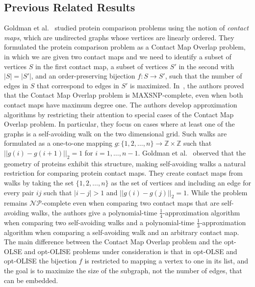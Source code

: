 \documentclass[11pt]{article}
\newcommand{\NP}{\mbox{$\mathcal{NP}$}}
\begin{document}
\subsection{Previous Related Results}\label{subsec:previous}
Goldman et al.~\cite{Goldman1999} studied protein comparison problems using the notion of {\em contact maps}, which are undirected graphs whose vertices are linearly ordered. They formulated the protein comparison problem as a {\sc Contact Map Overlap} problem, in which we are given two contact maps and we need to identify a subset of vertices $S$ in the first contact map, a subset of vertices $S'$ in the second with $|S| = |S'|$, and an order-preserving bijection $f: S \longrightarrow S'$, such that the number of edges in $S$ that correspond to edges in $S'$ is maximized. In~\cite{Goldman1999}, the authors proved that the {\sc Contact Map Overlap} problem is MAXSNP-complete, even when both contact maps have maximum degree one. The authors develop approximation algorithms by restricting their attention to special cases of the {\sc Contact Map Overlap} problem. In particular, they focus on cases where at least one of the graphs is a self-avoiding walk on the two dimensional grid.  Such walks are formulated as a one-to-one mapping $g : \{1, 2,\dotsc, n\} \to \mathbb{Z}\times\mathbb{Z}$ such that $||g(i)-g(i+1)||_2 = 1$ for $i = 1,\dotsc,n-1$.  Goldman et al.~\cite{Goldman1999} observed that the geometry of proteins exhibit this structure, making self-avoiding walks a natural restriction for comparing protein contact maps.  They create contact maps from walks by taking the set $\{1,2,\dotsc,n\}$ as the set of vertices and including an edge for every pair $ij$ such that $|i - j| > 1$ and $||g(i)-g(j)||_2 = 1$. While the problem remains \NP-complete even when comparing two contact maps that are self-avoiding walks, the authors give a polynomial-time $\frac{1}{4}$-approximation algorithm when comparing two self-avoiding walks and a polynomial-time $\frac{1}{3}$-approximation algorithm when comparing a self-avoiding walk and an arbitrary contact map. The main difference between the {\sc Contact Map Overlap} problem and the opt-OLSE and opt-OLISE problems under consideration is that in opt-OLSE and opt-OLISE the bijection $f$ is restricted to mapping a vertex to one in its list, and the goal is to maximize the size of the subgraph, not the number of edges, that can be embedded.
\end{document}
